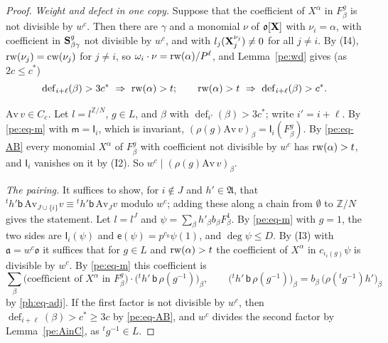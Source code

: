 \documentclass[10pt]{amsart}
\theoremstyle{definition}
\theoremstyle{remark}
\newcommand{\Z}{\mathbb Z}
\providecommand{\pao}{\mathfrak o}
\providecommand{\phA}{\mathfrak A}
\providecommand{\phdef}{\operatorname{def}}
\begin{document}
\begin{proof}
\emph{Weight and defect in one copy.} Suppose that the coefficient of $X^\alpha$ in $F^g_\beta$ is
not divisible by $w^c$. Then there are $\gamma$ and a monomial $\nu$ of $\pao[\peX]$ with
$\nu_i=\alpha$, with coefficient in $\mathbf S^g_{\beta\gamma}$ not divisible by $w^c$, and with
$l_j(\mathbf X_j^{\nu_j})\ne0$ for all $j\ne i$. By (I4), $\operatorname{rw}(\nu_j)=\operatorname{cw}(\nu_j)$ for $j\ne i$, so
$\omega_i\cdot\nu=\operatorname{rw}(\alpha)/P^\ell$, and Lemma~\ref{pe:wd} gives (as $2c\le c^*$)
\begin{equation}\label{pe:eq-AB}
\phdef_{i+\ell}(\beta)>3c^*\ \Rightarrow\ \perw(\alpha)>t;\qquad\perw(\alpha)>t\ \Rightarrow\
\phdef_{i+\ell}(\beta)>c^* .
\end{equation}

\emph{$\mathrm{Av}\,v\in C_c$.} Let $l=l^{\Z/N}$, $g\in L$, and $\beta$ with $\phdef_{i'}(\beta)>
3c^*$; write $i'=i+\ell$. By \eqref{pe:eq-m} with $\mathsf m=\mathsf I_i$, which is invariant,
$(\rho(g)\mathrm{Av}\,v)_\beta=\mathsf I_i(F^g_\beta)$. By \eqref{pe:eq-AB} every monomial
$X^\alpha$ of $F^g_\beta$ with coefficient not divisible by $w^c$ has $\operatorname{rw}(\alpha)>t$, and
$\mathsf I_i$ vanishes on it by (I2). So $w^c\mid(\rho(g)\mathrm{Av}\,v)_\beta$.

\emph{The pairing.} It suffices to show, for $i\notin J$ and $h'\in\phA$, that ${}^th'\mathsf b\,
\mathrm{Av}_{J\cup\{i\}}v\equiv{}^th'\mathsf b\,\mathrm{Av}_Jv$ modulo $w^c$; adding these along a
chain from $\emptyset$ to $\Z/N$ gives the statement. Let $l=l^J$ and $\psi=\sum_\beta h'_\beta
b_\beta F^1_\beta$. By \eqref{pe:eq-m} with $g=1$, the two sides are $\mathsf I_i(\psi)$ and
$\mathsf e(\psi)=p^{c_0}\psi(1)$, and $\deg\psi\le D$. By (I3) with $\mathfrak a=w^c\pao$ it suffices that
for $g\in L$ and $\operatorname{rw}(\alpha)>t$ the coefficient of $X^\alpha$ in $c_{\iota_i(g)}\psi$ is
divisible by $w^c$. By \eqref{pe:eq-m} this coefficient is
\[
\sum_\beta\bigl(\text{coefficient of }X^\alpha\text{ in }F^g_\beta\bigr)\cdot\bigl({}^th'\,\mathsf
b\,\rho(g^{-1})\bigr)_\beta,\qquad\bigl({}^th'\,\mathsf b\,\rho(g^{-1})\bigr)_\beta=b_\beta\,\bigl(
\rho({}^tg^{-1})h'\bigr)_\beta
\]
by \eqref{ph:eq-adj}. If the first factor is not divisible by $w^c$, then $\phdef_{i+\ell}(\beta)>
c^*\ge3c$ by \eqref{pe:eq-AB}, and $w^c$ divides the second factor by Lemma~\ref{pe:AinC}, as
${}^tg^{-1}\in L$.
\end{proof}
\end{document}

